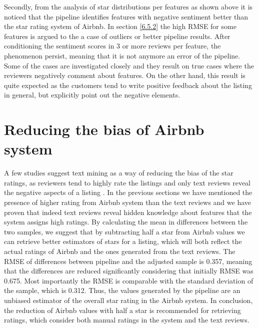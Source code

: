 Secondly, from the analysis of star distributions per features as shown above it is noticed that the pipeline identifies features with negative sentiment better than the star rating system of Airbnb. In section \ref{6.5.2} the high RMSE for some features is argued to the a case of outliers or better pipeline results. After conditioning the sentiment scores in 3 or more reviews per feature,
the phenomenon persist, meaning that it is not anymore an error of the pipeline. Some of the cases are investigated closely and they result on true cases where the reviewers negatively comment about features. On the other hand, this result is quite expected as the customers tend to write positive feedback about the listing in general, but explicitly point out the negative elements.
%
%
%
\section{Reducing the bias of Airbnb system}
A few studies suggest text mining as a way of reducing the bias of the star ratings, as reviewers tend to highly rate the listings and only text reviews reveal the negative aspects of a listing \cite{fradkin2016bias,pavlou2006institutional,pavlou2006nature}. In the previous sections we have mentioned the presence of higher rating from Airbnb system than the text reviews and  we have proven that indeed text reviews reveal hidden knowledge about features that the system assigns high ratings. By calculating the mean in differences between the two samples, we suggest that by subtracting half a star from Airbnb values we can retrieve better estimators of stars for a listing, which will both reflect the actual ratings of Airbnb and the ones generated from the text reviews. The RMSE of differences between pipeline and the adjusted sample is 0.357, meaning that the differences are reduced significantly considering that initially RMSE was 0.675. Most importantly the RMSE is comparable with the standard deviation of the sample, which is 0.312. Thus, the values generated by the pipeline are an unbiased estimator of the overall star rating in the Airbnb system. In conclusion, the reduction of Airbnb values with half a star is recommended for retrieving ratings, which consider both manual ratings in the system and the text reviews.
